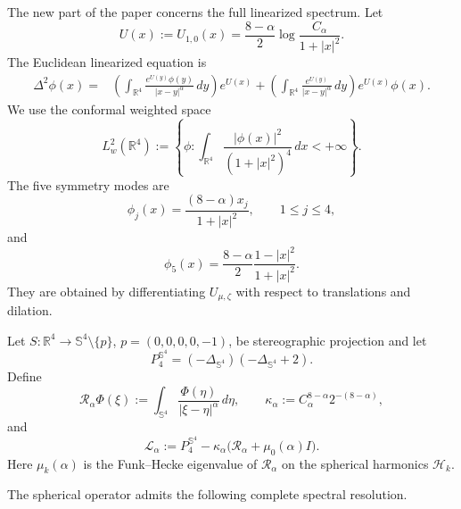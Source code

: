 \documentclass[11pt]{article}
\numberwithin{equation}{section}
\begin{document}
The new part of the paper concerns the full linearized spectrum. Let
\begin{equation}\label{eq:normalized-bubble}
U(x):=U_{1,0}(x)
=\frac{8-\alpha}{2}\log\frac{C_{\alpha}}{1+|x|^{2}}.
\end{equation}
The Euclidean linearized equation is
\begin{equation}\label{eq:linearized}
\begin{aligned}
\Delta^{2}\phi(x)
={}&
\left(\int_{\mathbb R^{4}}
\frac{e^{U(y)}\phi(y)}{|x-y|^{\alpha}}\,dy\right)e^{U(x)}+
\left(\int_{\mathbb R^{4}}
\frac{e^{U(y)}}{|x-y|^{\alpha}}\,dy\right)e^{U(x)}\phi(x).
\end{aligned}
\end{equation}
We use the conformal weighted space
\begin{equation*}
L^{2}_{w}(\mathbb R^{4})
:=
\left\{\phi:
\int_{\mathbb R^{4}}
\frac{|\phi(x)|^{2}}{(1+|x|^{2})^{4}}\,dx<+\infty
\right\}.
\end{equation*}
The five symmetry modes are
\begin{equation}\label{eq:kernel-functions}
\phi_{j}(x)=\frac{(8-\alpha)x_{j}}{1+|x|^{2}},
\qquad 1\leq j\leq4,
\end{equation}
and
\begin{equation}\label{eq:kernel-scale}
\phi_{5}(x)=\frac{8-\alpha}{2}
\frac{1-|x|^{2}}{1+|x|^{2}}.
\end{equation}
They are obtained by differentiating \(U_{\mu,\zeta}\) with respect to translations and dilation.

Let \(S:\mathbb R^{4}\to\mathbb S^{4}\setminus\{p\}\), \(p=(0,0,0,0,-1)\), be stereographic projection and let
\[
P_{4}^{\mathbb S^{4}}
=(-\Delta_{\mathbb S^{4}})(-\Delta_{\mathbb S^{4}}+2).
\]
Define
\[
\mathcal R_{\alpha}\Phi(\xi)
:=\int_{\mathbb S^{4}}\frac{\Phi(\eta)}{|\xi-\eta|^{\alpha}}\,d\eta,
\qquad
\kappa_{\alpha}:=C_{\alpha}^{8-\alpha}2^{-(8-\alpha)},
\]
and
\begin{equation*}
\mathcal L_{\alpha}
:=P_{4}^{\mathbb S^{4}}
-\kappa_{\alpha}
\bigl(\mathcal R_{\alpha}+\mu_{0}(\alpha)I\bigr).
\end{equation*}
Here \(\mu_{k}(\alpha)\) is the Funk--Hecke eigenvalue of \(\mathcal R_{\alpha}\) on the spherical harmonics \(\mathcal H_{k}\).

The spherical operator admits the following complete spectral resolution.
\end{document}
